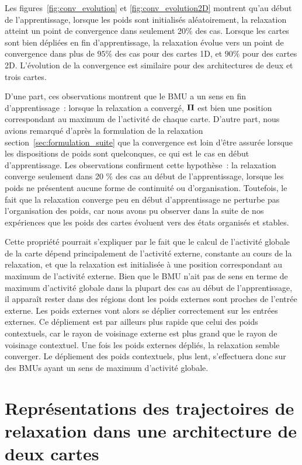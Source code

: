 \documentclass[../main]{subfiles}
\begin{document}
Les figures~\ref{fig:conv_evolution} et \ref{fig:conv_evolution2D} montrent qu'au début de l'apprentissage, lorsque les poids sont initialisés aléatoirement, la relaxation atteint un point de convergence dans seulement 20\% des cas. Lorsque les cartes sont bien dépliées en fin d'apprentissage, la relaxation évolue vers un point de convergence dans plus de $95\%$ des cas pour des cartes 1D, et $90\%$ pour des cartes 2D. L'évolution de la convergence est similaire pour des architectures de deux et trois cartes.

D'une part, ces observations montrent que le BMU a un sens en fin d'apprentissage~: lorsque la relaxation a convergé, $\mathbf{\Pi}$ est bien une position correspondant au maximum de l'activité de chaque carte.
D'autre part, nous avions remarqué d'après la formulation de la relaxation section~\ref{sec:formulation_suite} que la convergence est loin d'être assurée lorsque les dispositions de poids sont quelconques, ce qui est  le cas en début d'apprentissage. 
Les observations confirment cette hypothèse~: la relaxation converge seulement dans 20 \% des cas au début de l'apprentissage, lorsque les poids ne présentent aucune forme de continuité ou d'organisation.
Toutefois, le fait que la relaxation converge peu en début d'apprentissage ne perturbe pas l'organisation des poids, car nous avons pu observer dans la suite de nos expériences que les poids des cartes évoluent vers des états organisés et stables.

Cette propriété pourrait s'expliquer par le fait que le calcul de l'activité globale de la carte dépend principalement de l'activité externe, constante au cours de la relaxation, et que la relaxation est initialisée à une position correspondant au maximum de l'activité externe.
Bien que le BMU n'ait pas de sens en terme de maximum d'activité globale dans la plupart des cas au début de l'apprentissage, il apparaît rester dans des régions dont les poids externes sont proches de l'entrée externe.
Les poids externes vont alors se déplier correctement sur les entrées externes. Ce dépliement est par ailleurs plus rapide que celui des poids contextuels, car le rayon de voisinage externe est plus grand que le rayon de voisinage contextuel.
Une fois les poids externes dépliés, la relaxation semble converger. Le dépliement des poids contextuels, plus lent, s'effectuera donc sur des BMUs ayant un sens de maximum d'activité globale.

\section{Représentations des trajectoires de relaxation dans une architecture de deux cartes}
\end{document}
